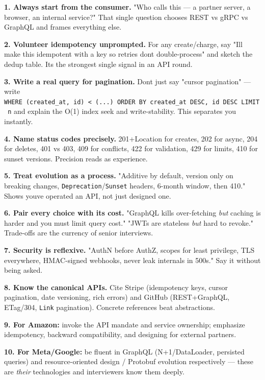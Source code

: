 \documentclass[11pt]{article}
\begin{document}
\textbf{1. Always start from the consumer.} "Who calls this --- a partner server, a browser, an internal service?" That single question chooses REST vs gRPC vs GraphQL and frames everything else.

\textbf{2. Volunteer idempotency unprompted.} For any create/charge, say "I\textquotesingle ll make this idempotent with a key so retries don\textquotesingle t double-process" and sketch the dedup table. It\textquotesingle s the strongest single signal in an API round.

\textbf{3. Write a real query for pagination.} Don\textquotesingle t just say "cursor pagination" --- write \texttt{WHERE\ (created\_at,\ id)\ \textless{}\ (...)\ ORDER\ BY\ created\_at\ DESC,\ id\ DESC\ LIMIT\ n} and explain the O(1) index seek and write-stability. This separates you instantly.

\textbf{4. Name status codes precisely.} 201+Location for creates, 202 for async, 204 for deletes, 401 vs 403, 409 for conflicts, 422 for validation, 429 for limits, 410 for sunset versions. Precision reads as experience.

\textbf{5. Treat evolution as a process.} "Additive by default, version only on breaking changes, \texttt{Deprecation}/\texttt{Sunset} headers, 6-month window, then 410." Shows you\textquotesingle ve operated an API, not just designed one.

\textbf{6. Pair every choice with its cost.} "GraphQL kills over-fetching \emph{but} caching is harder and you must limit query cost." "JWTs are stateless \emph{but} hard to revoke." Trade-offs are the currency of senior interviews.

\textbf{7. Security is reflexive.} "AuthN before AuthZ, scopes for least privilege, TLS everywhere, HMAC-signed webhooks, never leak internals in 500s." Say it without being asked.

\textbf{8. Know the canonical APIs.} Cite Stripe (idempotency keys, cursor pagination, date versioning, rich errors) and GitHub (REST+GraphQL, ETag/304, \texttt{Link} pagination). Concrete references beat abstractions.

\textbf{9. For Amazon:} invoke the API mandate and service ownership; emphasize idempotency, backward compatibility, and designing for external partners.

\textbf{10. For Meta/Google:} be fluent in GraphQL (N+1/DataLoader, persisted queries) and resource-oriented design / Protobuf evolution respectively --- these are \emph{their} technologies and interviewers know them deeply.
\end{document}

